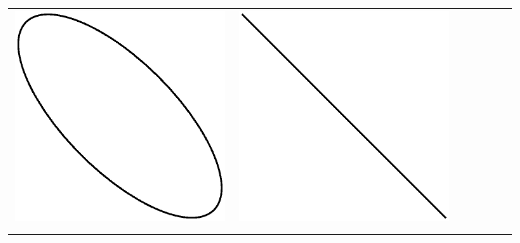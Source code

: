 \begin{center}
\begin{tabular}{c|ccccc}
\includegraphics[scale=0.2]{05_Oscilloscope/1-4.eps} &
\includegraphics[scale=0.2]{05_Oscilloscope/1-5.eps} \\
&&&&&\\

\end{tabular}
\end{center}
